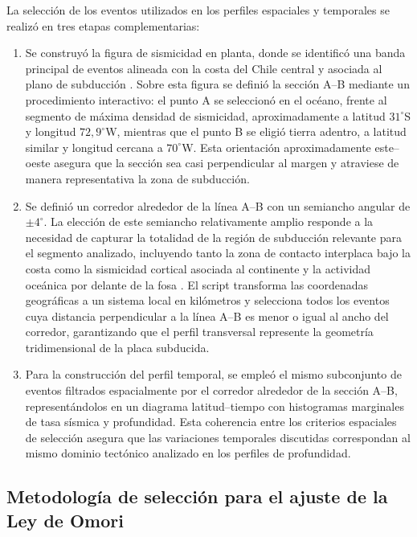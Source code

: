 \documentclass[a4paper,12pt]{article} %
\numberwithin{equation}{section} %
\numberwithin{figure}{section} %
\begin{document}
La selección de los eventos utilizados en los perfiles espaciales y temporales se realizó en tres etapas complementarias:
\begin{enumerate}
    \item Se construyó la figura de sismicidad en planta, donde se identificó una banda principal de eventos alineada con la costa del Chile central y asociada al plano de subducción \cite{fernandez_2018}. Sobre esta figura se definió la sección A--B mediante un procedimiento interactivo: el punto A se seleccionó en el océano, frente al segmento de máxima densidad de sismicidad, aproximadamente a latitud $31^\circ$S y longitud $72{,}9^\circ$W, mientras que el punto B se eligió tierra adentro, a latitud similar y longitud cercana a $70^\circ$W. Esta orientación aproximadamente este--oeste asegura que la sección sea casi perpendicular al margen y atraviese de manera representativa la zona de subducción.
    \item Se definió un corredor alrededor de la línea A--B con un semiancho angular de $\pm 4^\circ$. La elección de este semiancho relativamente amplio responde a la necesidad de capturar la totalidad de la región de subducción relevante para el segmento analizado, incluyendo tanto la zona de contacto interplaca bajo la costa como la sismicidad cortical asociada al continente y la actividad oceánica por delante de la fosa \cite{fernandez_2018,slip_illapel_2015}. El script transforma las coordenadas geográficas a un sistema local en kilómetros y selecciona todos los eventos cuya distancia perpendicular a la línea A--B es menor o igual al ancho del corredor, garantizando que el perfil transversal represente la geometría tridimensional de la placa subducida.
    \item Para la construcción del perfil temporal, se empleó el mismo subconjunto de eventos filtrados espacialmente por el corredor alrededor de la sección A--B, representándolos en un diagrama latitud--tiempo con histogramas marginales de tasa sísmica y profundidad. Esta coherencia entre los criterios espaciales de selección asegura que las variaciones temporales discutidas correspondan al mismo dominio tectónico analizado en los perfiles de profundidad.
\end{enumerate}

\subsection{Metodología de selección para el ajuste de la Ley de Omori}
\end{document}
